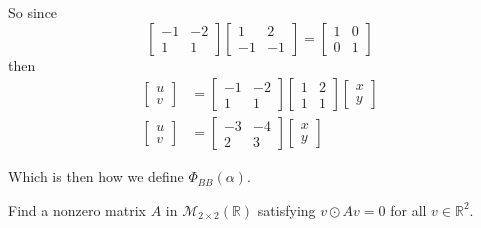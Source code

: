 \documentclass{article}
\begin{document}
\begin{solution}
So since
\[
\begin{bmatrix}
-1 & -2 \\
1 & 1
\end{bmatrix}
\begin{bmatrix}
1 & 2 \\
-1 & -1
\end{bmatrix}
=
\begin{bmatrix}
1 & 0 \\
0 & 1
\end{bmatrix}
\]
then
\begin{align*}
\begin{bmatrix}
u\\ v
\end{bmatrix}
&=
\begin{bmatrix}
-1 & -2 \\
1 & 1
\end{bmatrix}
\begin{bmatrix}
1 & 2 \\
1 & 1
\end{bmatrix}
\begin{bmatrix}
x\\ y
\end{bmatrix}\\
\begin{bmatrix}
u\\ v
\end{bmatrix}
&=
\begin{bmatrix}
-3 & -4 \\
2 & 3
\end{bmatrix}
\begin{bmatrix}
x\\ y
\end{bmatrix}
\end{align*}

Which is then how we define $\Phi_{BB}(\alpha)$.
\end{solution}

\setcounter{problem}{430}
\begin{problem}
Find a nonzero matrix $A$ in $\mathcal{M}_{2\times 2}(\mathbb{R})$ satisfying $v\odot Av = 0$ for all $v\in\mathbb{R}^{2}$.
\end{problem}
\end{document}
